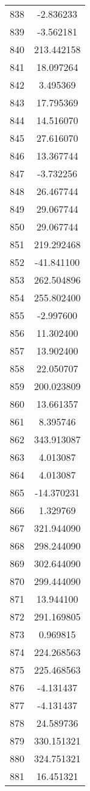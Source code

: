 \documentclass[12pt]{article}
\begin{document}
\begin{longtable}{@{}cc@{}}
838 & -2.836233 \\
839 & -3.562181 \\
840 & 213.442158 \\
841 & 18.097264 \\
842 & 3.495369 \\
843 & 17.795369 \\
844 & 14.516070 \\
845 & 27.616070 \\
846 & 13.367744 \\
847 & -3.732256 \\
848 & 26.467744 \\
849 & 29.067744 \\
850 & 29.067744 \\
851 & 219.292468 \\
852 & -41.841100 \\
853 & 262.504896 \\
854 & 255.802400 \\
855 & -2.997600 \\
856 & 11.302400 \\
857 & 13.902400 \\
858 & 22.050707 \\
859 & 200.023809 \\
860 & 13.661357 \\
861 & 8.395746 \\
862 & 343.913087 \\
863 & 4.013087 \\
864 & 4.013087 \\
865 & -14.370231 \\
866 & 1.329769 \\
867 & 321.944090 \\
868 & 298.244090 \\
869 & 302.644090 \\
870 & 299.444090 \\
871 & 13.944100 \\
872 & 291.169805 \\
873 & 0.969815 \\
874 & 224.268563 \\
875 & 225.468563 \\
876 & -4.131437 \\
877 & -4.131437 \\
878 & 24.589736 \\
879 & 330.151321 \\
880 & 324.751321 \\
881 & 16.451321 \\

\end{longtable}
\end{document}
